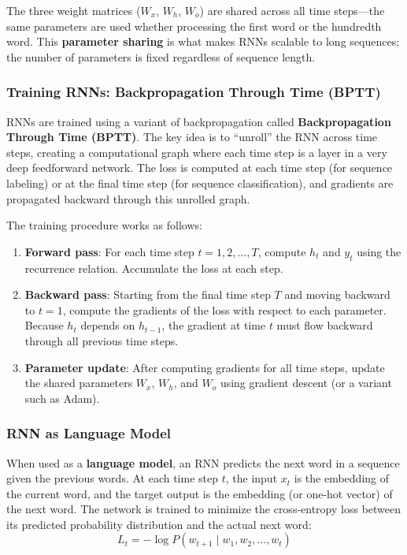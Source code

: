 \documentclass[11pt,a4paper]{article}
\begin{document}
The three weight matrices ($W_x$, $W_h$, $W_o$) are shared across all time steps---the same parameters are used whether processing the first word or the hundredth word. This \textbf{parameter sharing} is what makes RNNs scalable to long sequences: the number of parameters is fixed regardless of sequence length.

\subsubsection{Training RNNs: Backpropagation Through Time (BPTT)}

RNNs are trained using a variant of backpropagation called \textbf{Backpropagation Through Time (BPTT)}. The key idea is to ``unroll'' the RNN across time steps, creating a computational graph where each time step is a layer in a very deep feedforward network. The loss is computed at each time step (for sequence labeling) or at the final time step (for sequence classification), and gradients are propagated backward through this unrolled graph.

The training procedure works as follows:
\begin{enumerate}
    \item \textbf{Forward pass}: For each time step $t = 1, 2, \ldots, T$, compute $h_t$ and $y_t$ using the recurrence relation. Accumulate the loss at each step.
    \item \textbf{Backward pass}: Starting from the final time step $T$ and moving backward to $t = 1$, compute the gradients of the loss with respect to each parameter. Because $h_t$ depends on $h_{t-1}$, the gradient at time $t$ must flow backward through all previous time steps.
    \item \textbf{Parameter update}: After computing gradients for all time steps, update the shared parameters $W_x$, $W_h$, and $W_o$ using gradient descent (or a variant such as Adam).
\end{enumerate}

\subsubsection{RNN as Language Model}

When used as a \textbf{language model}, an RNN predicts the next word in a sequence given the previous words. At each time step $t$, the input $x_t$ is the embedding of the current word, and the target output is the embedding (or one-hot vector) of the next word. The network is trained to minimize the cross-entropy loss between its predicted probability distribution and the actual next word:
\[
L_t = -\log P(w_{t+1} \mid w_1, w_2, \ldots, w_t)
\]
\end{document}
